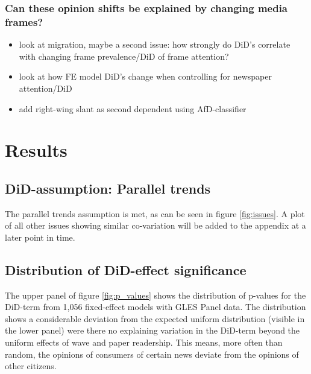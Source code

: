 \documentclass{article}
\begin{document}
\subsubsection{Can these opinion shifts be explained by changing media frames?}

\begin{itemize}
    \item look at migration, maybe a second issue: how strongly do DiD's correlate with changing frame prevalence/DiD of frame attention?
    \item look at how FE model DiD's change when controlling for newspaper attention/DiD
    \item add right-wing slant as second dependent using AfD-classifier
\end{itemize}

\section{Results}

\subsection{DiD-assumption: Parallel trends}

The parallel trends assumption is met, as can be seen in figure \ref{fig:issues}. A plot of all other issues showing similar co-variation will be added to the appendix at a later point in time.
    

\subsection{Distribution of DiD-effect significance}

The upper panel of figure \ref{fig:p_values} shows the distribution of p-values for the DiD-term from 1,056 fixed-effect models with GLES Panel data. The distribution shows a considerable deviation from the expected uniform distribution (visible in the lower panel) were there no explaining variation in the DiD-term beyond the uniform effects of wave and paper readership. This means, more often than random, the opinions of consumers of certain news deviate from the opinions of other citizens.
\end{document}
